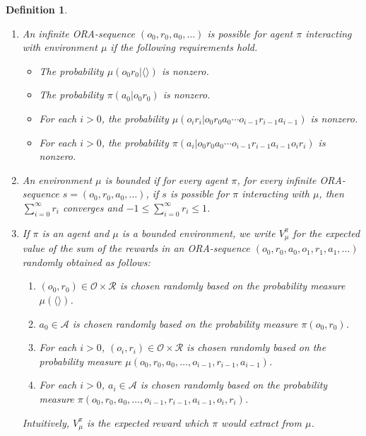\documentclass{article}
\newtheorem{definition}[theorem]{Definition}
\begin{document}
\begin{definition}
\begin{enumerate}
        By an \emph{environment}, we mean a function $\mu$
        which assigns to every ORA-play $p$ a probability measure $\mu(p)$
        on $\mathcal O\times\mathcal R$.
        For each $o\in\mathcal O$ and $r\in\mathcal R$, we write $\mu(or|p)$
        for the probability assigned to $(o,r)$ by $\mu(p)$.
        Intuitively, we think of $\mu(or|p)$ as the probability that the environment
        $\mu$ will issue observation $o$ and reward $r$ to the agent in response
        to the ORA-play $p$.
        \item
        An infinite ORA-sequence $(o_0,r_0,a_0,\ldots)$ is \emph{possible for agent
        $\pi$ interacting with environment $\mu$} if the following requirements hold.
        \begin{itemize}
            \item The probability $\mu(o_0r_0|\langle\rangle)$ is nonzero.
            \item The probability $\pi(a_0|o_0r_0)$ is nonzero.
            \item For each $i>0$, the probability
                $\mu(o_ir_i|o_0r_0a_0\cdots o_{i-1}r_{i-1}a_{i-1})$ is nonzero.
            \item For each $i>0$, the probability
                $\pi(a_i|o_0r_0a_0\cdots o_{i-1}r_{i-1}a_{i-1}o_ir_i)$ is nonzero.
        \end{itemize}
        \item
        An environment $\mu$ is \emph{bounded} if for every agent $\pi$,
        for every infinite ORA-sequence $s=(o_0,r_0,a_0,\ldots)$,
        if $s$ is possible for $\pi$ interacting with $\mu$, then
        $\sum_{i=0}^\infty r_i$ converges and $-1\leq \sum_{i=0}^\infty r_i\leq 1$.
        \item
        If $\pi$ is an agent and $\mu$ is a bounded environment,
        we write $V^\pi_\mu$ for the expected value of the sum of the rewards in an
        ORA-sequence $(o_0,r_0,a_0,o_1,r_1,a_1,\ldots)$ randomly obtained as follows:
        \begin{enumerate}
            \item $(o_0,r_0)\in \mathcal O\times\mathcal R$ is chosen randomly based
            on the probability measure $\mu(\langle\rangle)$.
            \item $a_0\in\mathcal A$ is chosen randomly based on the probability
            measure $\pi(o_0,r_0)$.
            \item
            For each $i>0$,
            $(o_i,r_i)\in\mathcal O\times\mathcal R$ is chosen randomly based on
            the probability measure $\mu(o_0,r_0,a_0,\ldots,o_{i-1},r_{i-1},a_{i-1})$.
            \item
            For each $i>0$,
            $a_i\in\mathcal A$ is chosen randomly based on the probability measure
            $\pi(o_0,r_0,a_0,\ldots,o_{i-1},r_{i-1},a_{i-1},o_i,r_i)$.
        \end{enumerate}
        Intuitively, $V^\pi_\mu$ is the expected reward which $\pi$ would extract
        from $\mu$.
    \end{enumerate}
\end{definition}



\end{document}
